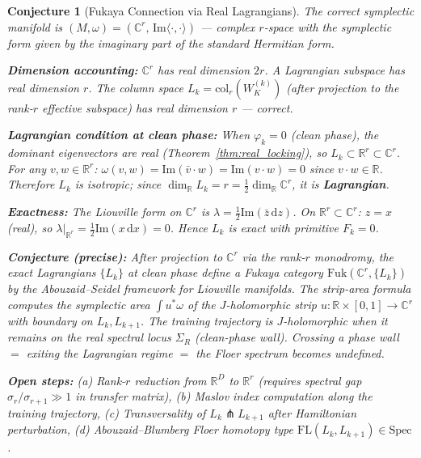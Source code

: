 \documentclass[11pt]{amsart}
\newtheorem{conjecture}[theorem]{Conjecture}
\begin{document}
\begin{conjecture}[Fukaya Connection via Real Lagrangians]
\label{conj:fukaya}
The correct symplectic manifold is $(M, \omega) = (\mathbb{C}^r,\,
\mathrm{Im}\langle\cdot,\cdot\rangle)$ --- complex $r$-space with the
symplectic form given by the imaginary part of the standard Hermitian form.

\textbf{Dimension accounting:}
$\mathbb{C}^r$ has real dimension $2r$.
A Lagrangian subspace has real dimension $r$.
The column space $L_k = \mathrm{col}_r(W_K^{(k)})$ (after projection
to the rank-$r$ effective subspace) has real dimension $r$ --- correct.

\textbf{Lagrangian condition at clean phase:}
When $\varphi_k = 0$ (clean phase), the dominant eigenvectors are real
(Theorem~\ref{thm:real_locking}), so $L_k \subset \mathbb{R}^r \subset \mathbb{C}^r$.
For any $v, w \in \mathbb{R}^r$:
$\omega(v,w) = \mathrm{Im}(\bar{v} \cdot w) = \mathrm{Im}(v \cdot w) = 0$
since $v \cdot w \in \mathbb{R}$.
Therefore $L_k$ is isotropic; since $\dim_\mathbb{R} L_k = r = \frac{1}{2}\dim_\mathbb{R}\mathbb{C}^r$,
it is \textbf{Lagrangian}.

\textbf{Exactness:}
The Liouville form on $\mathbb{C}^r$ is
$\lambda = \frac{1}{2}\mathrm{Im}(\bar{z}\,\mathrm{d}z)$.
On $\mathbb{R}^r \subset \mathbb{C}^r$: $z = x$ (real), so
$\lambda|_{\mathbb{R}^r} = \frac{1}{2}\mathrm{Im}(x\,\mathrm{d}x) = 0$.
Hence $L_k$ is exact with primitive $F_k = 0$.

\textbf{Conjecture (precise):}
After projection to $\mathbb{C}^r$ via the rank-$r$ monodromy,
the exact Lagrangians $\{L_k\}$ at clean phase define a Fukaya category
$\mathrm{Fuk}(\mathbb{C}^r, \{L_k\})$ by the Abouzaid--Seidel framework
for Liouville manifolds.
The strip-area formula computes the symplectic area $\int u^*\omega$
of the $J$-holomorphic strip $u: \mathbb{R} \times [0,1] \to \mathbb{C}^r$
with boundary on $L_k, L_{k+1}$.
The training trajectory is $J$-holomorphic when it remains on the
real spectral locus $\Sigma_R$ (clean-phase wall).
Crossing a phase wall $=$ exiting the Lagrangian regime $=$ the Floer
spectrum becomes undefined.

\textbf{Open steps:}
(a) Rank-$r$ reduction from $\mathbb{R}^D$ to $\mathbb{R}^r$
    (requires spectral gap $\sigma_r/\sigma_{r+1} \gg 1$ in transfer matrix),
(b) Maslov index computation along the training trajectory,
(c) Transversality of $L_k \pitchfork L_{k+1}$ after Hamiltonian perturbation,
(d) Abouzaid--Blumberg Floer homotopy type $\mathrm{FL}(L_k, L_{k+1}) \in \mathrm{Spec}$.


\end{conjecture}
\end{document}
